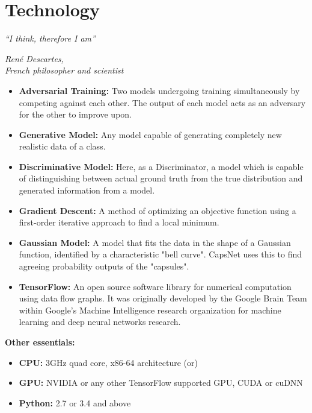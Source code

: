 \chapter{Technology}\label{ch:technology}
\epigraph{\textit{\normalsize“I think, therefore I am”}}{\textit{ \normalsize René Descartes,\\ French philosopher and scientist}}
\begin{itemize}
	\item\textbf{Adversarial Training:} Two models undergoing training simultaneously by competing against each other. The output of each model acts as an adversary for the other to improve upon.
	\item\textbf{Generative Model:} Any model capable of generating completely new realistic data of a class.
	\item\textbf{Discriminative Model:} Here, as a Discriminator, a model which is capable of distinguishing between actual ground truth from the true distribution and generated information from a model.
	\item\textbf{Gradient Descent:} A method of optimizing an objective function using a first-order iterative approach to find a local minimum.
	\item\textbf{Gaussian Model:} A model that fits the data in the shape of a Gaussian function, identified by a characteristic "bell curve". CapsNet uses this to find agreeing probability outputs of the "capsules".
	\item\textbf{TensorFlow:} An open source software library for numerical computation using data flow graphs. It was originally developed by the Google Brain Team within Google's Machine Intelligence research organization for machine learning and deep neural networks research.

\end{itemize}

\textbf{\Large Other essentials:}

\begin{itemize}
	\item\textbf{CPU:} 3GHz quad core, x86-64 architecture (or)
	\item\textbf{GPU:} NVIDIA or any other TensorFlow supported GPU, CUDA or cuDNN
	\item\textbf{Python:} 2.7 or 3.4 and above
\end{itemize}
